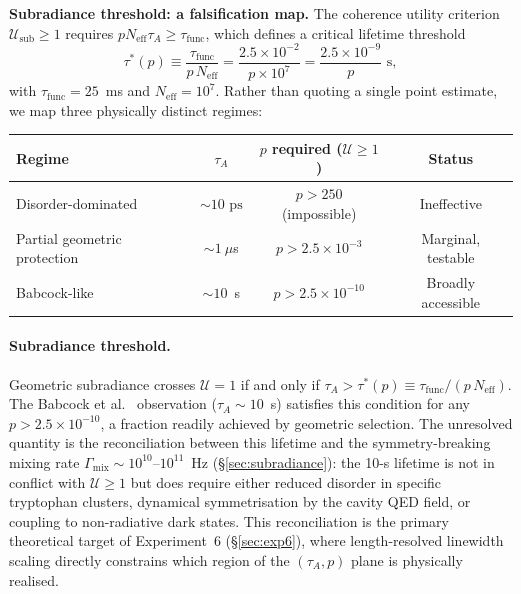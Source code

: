 \documentclass[twocolumn,10pt]{article}
\newcommand{\ps}{\text{~ps}}
\begin{document}
\textbf{Subradiance threshold: a falsification map.}
The coherence utility criterion $\mathcal{U}_{\text{sub}}\ge 1$ requires
$p N_{\text{eff}} \tau_A \ge \tau_{\text{func}}$, which defines a
critical lifetime threshold
\begin{equation}
\tau^*(p) \equiv \frac{\tau_{\text{func}}}{p\,N_{\text{eff}}}
= \frac{2.5\times 10^{-2}}{p\times 10^7}
= \frac{2.5\times 10^{-9}}{p} \text{~s},
\label{eq:subradiance_threshold}
\end{equation}
with $\tau_{\text{func}} = 25$~ms and $N_{\text{eff}} = 10^7$.
Rather than quoting a single point estimate, we map three physically
distinct regimes:
\begin{center}
\footnotesize
\begin{tabular}{lccc}
\toprule
Regime & $\tau_A$ & $p$ required ($\mathcal{U}\ge 1$) & Status \\
\midrule
Disorder-dominated & $\sim 10\ps$ & $p > 250$ (impossible) & Ineffective \\
Partial geometric protection & $\sim 1~\mu$s & $p > 2.5\times 10^{-3}$ & Marginal, testable \\
Babcock-like & $\sim 10$~s & $p > 2.5\times 10^{-10}$ & Broadly accessible \\
\bottomrule
\end{tabular}
\end{center}
\paragraph{Subradiance threshold.}
\label{prop:subradiance_threshold}
Geometric subradiance crosses $\mathcal{U}=1$ if and only if
$\tau_A > \tau^*(p) \equiv \tau_{\mathrm{func}}/(p\,N_{\mathrm{eff}})$.
The Babcock et al.\ \cite{Babcock2024} observation ($\tau_A \sim 10$~s)
satisfies this condition for any $p > 2.5\times 10^{-10}$, a fraction
readily achieved by geometric selection. The unresolved quantity is the
reconciliation between this lifetime and the symmetry-breaking mixing rate
$\Gamma_{\mathrm{mix}}\sim 10^{10}\text{--}10^{11}$~Hz
(\S\ref{sec:subradiance}): the 10-s lifetime is not in conflict with
$\mathcal{U}\ge 1$ but does require either reduced disorder in specific
tryptophan clusters, dynamical symmetrisation by the cavity QED field, or
coupling to non-radiative dark states. This reconciliation is the primary
theoretical target of Experiment~6 (\S\ref{sec:exp6}), where
length-resolved linewidth scaling directly constrains which region of
the $(\tau_A, p)$ plane is physically realised.
\end{document}
